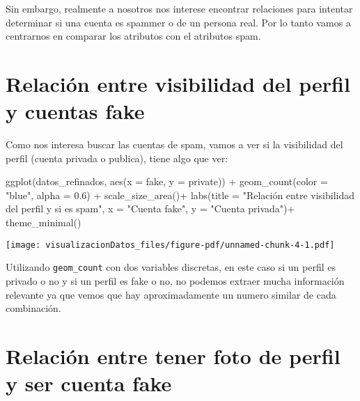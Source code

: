 \documentclass[
  letterpaper,
  DIV=11,
  numbers=noendperiod]{scrreprt}
\newenvironment{Shaded}{\begin{snugshade}}{\end{snugshade}}
\newcommand{\AttributeTok}[1]{\textcolor[rgb]{0.40,0.45,0.13}{#1}}
\newcommand{\FloatTok}[1]{\textcolor[rgb]{0.68,0.00,0.00}{#1}}
\newcommand{\FunctionTok}[1]{\textcolor[rgb]{0.28,0.35,0.67}{#1}}
\newcommand{\NormalTok}[1]{\textcolor[rgb]{0.00,0.23,0.31}{#1}}
\newcommand{\SpecialCharTok}[1]{\textcolor[rgb]{0.37,0.37,0.37}{#1}}
\newcommand{\StringTok}[1]{\textcolor[rgb]{0.13,0.47,0.30}{#1}}
\begin{document}
Sin embargo, realmente a nosotros nos interese encontrar relaciones para
intentar determinar si una cuenta es spammer o de un persona real. Por
lo tanto vamos a centrarnos en comparar los atributos con el atributos
spam.

\section{Relación entre visibilidad del perfil y cuentas
fake}\label{relaciuxf3n-entre-visibilidad-del-perfil-y-cuentas-fake}

Como nos interesa buscar las cuentas de spam, vamos a ver si la
visibilidad del perfil (cuenta privada o publica), tiene algo que ver:

\begin{Shaded}
\begin{Highlighting}[]
\FunctionTok{ggplot}\NormalTok{(datos\_refinados, }\FunctionTok{aes}\NormalTok{(}\AttributeTok{x =} \StringTok{\textasciigrave{}}\AttributeTok{fake}\StringTok{\textasciigrave{}}\NormalTok{, }\AttributeTok{y =} \StringTok{\textasciigrave{}}\AttributeTok{private}\StringTok{\textasciigrave{}}\NormalTok{)) }\SpecialCharTok{+}   
  \FunctionTok{geom\_count}\NormalTok{(}\AttributeTok{color =} \StringTok{"blue"}\NormalTok{, }\AttributeTok{alpha =} \FloatTok{0.6}\NormalTok{) }\SpecialCharTok{+}   
  \FunctionTok{scale\_size\_area}\NormalTok{()}\SpecialCharTok{+}   
  \FunctionTok{labs}\NormalTok{(}\AttributeTok{title =} \StringTok{"Relación entre visibilidad del perfil y si es spam"}\NormalTok{,        }
       \AttributeTok{x =} \StringTok{"Cuenta fake"}\NormalTok{,        }
       \AttributeTok{y =} \StringTok{"Cuenta privada"}\NormalTok{)}\SpecialCharTok{+}   
  \FunctionTok{theme\_minimal}\NormalTok{() }
\end{Highlighting}
\end{Shaded}

\texttt{[image: visualizacionDatos\_files/figure-pdf/unnamed-chunk-4-1.pdf]}

Utilizando \texttt{geom\_count} con dos variables discretas, en este
caso si un perfil es privado o no y si un perfil es fake o no, no
podemos extraer mucha información relevante ya que vemos que hay
aproximadamente un numero similar de cada combinación.

\section{Relación entre tener foto de perfil y ser cuenta
fake}\label{relaciuxf3n-entre-tener-foto-de-perfil-y-ser-cuenta-fake}
\end{document}
